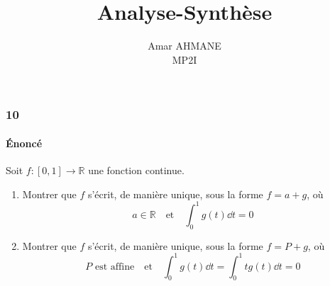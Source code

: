 \documentclass[10pt]{article}
\title{\huge\textbf{Analyse-Synthèse}}
\author{Amar AHMANE\\ MP2I}
\date{}
\def\R{\mathbb R}
\begin{document}
    \maketitle
    \subsubsection*{10}
    \paragraph{Énoncé} Soit $f:[0,1]\to \R$ une fonction continue.
    \begin{enumerate}
        \item Montrer que $f$ s'écrit, de manière unique, sous la forme $f=a+g$, où \[a\in\R\quad\text{et}\quad\int_0^1g(t)\dd t=0\]
        \item Montrer que $f$ s'écrit, de manière unique, sous la forme $f=P+g$, où \[P\text{ est affine}\quad\text{et}\quad\int_0^1g(t)\dd t=\int_0^1tg(t)\dd t=0\]
    \end{enumerate}
\end{document}
